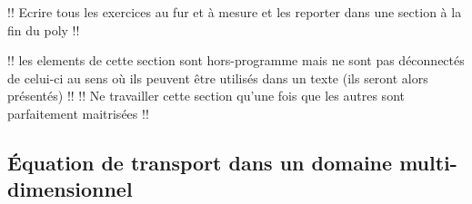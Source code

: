 \documentclass[12pt,a4paper,twoside]{article}
\begin{document}
!! Ecrire tous les exercices au fur et \`a mesure et les reporter
dans une section \`a la fin du poly !!


!! les elements de cette section sont hors-programme mais ne sont pas 
d\'econnect\'es de celui-ci au sens o\`u ils peuvent \^etre utilis\'es 
dans un texte (ils seront alors pr\'esent\'es) !!
!! Ne travailler cette section qu'une fois que les autres sont parfaitement maitris\'ees !!

\subsection{\'Equation de transport dans un domaine multi-dimensionnel}
\label{subsec:transport_multiD}


\end{document}
